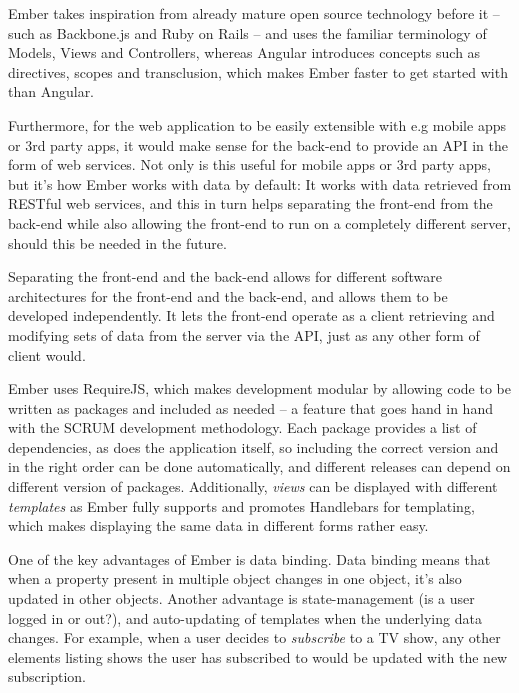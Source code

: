 Ember takes inspiration from already mature open source technology before it -- such as Backbone.js and Ruby on Rails -- and uses the familiar terminology of Models, Views and Controllers, whereas Angular introduces concepts such as directives, scopes and transclusion, which makes Ember faster to get started with than Angular.

Furthermore, for the web application to be easily extensible with e.g mobile apps or 3rd party apps, it would make sense for the back-end to provide an API in the form of web services. Not only is this useful for mobile apps or 3rd party apps, but it's how Ember works with data by default: It works with data retrieved from RESTful web services, and this in turn helps separating the front-end from the back-end while also allowing the front-end to run on a completely different server, should this be needed in the future. 

Separating the front-end and the back-end allows for different software architectures for the front-end and the back-end, and allows them to be developed independently. It lets the front-end operate as a client retrieving and modifying sets of data from the server via the API, just as any other form of client would.

Ember uses RequireJS, which makes development modular by allowing code to be written as packages and included as needed -- a feature that goes hand in hand with the SCRUM development methodology. Each package provides a list of dependencies, as does the application itself, so including the correct version and in the right order can be done automatically, and different releases can depend on different version of packages. Additionally, \textit{views} can be displayed with different \textit{templates} as Ember fully supports and promotes Handlebars for templating, which makes displaying the same data in different forms rather easy.

One of the key advantages of Ember is data binding. Data binding means that when a property present in multiple object changes in one object, it's also updated in other objects. Another advantage is state-management (is a user logged in or out?), and auto-updating of templates when the underlying data changes. For example, when a user decides to \textit{subscribe} to a TV show, any other elements listing shows the user has subscribed to would be updated with the new subscription. 